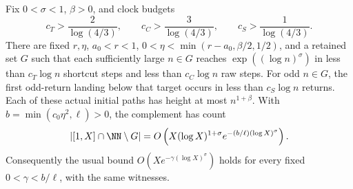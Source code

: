 \begin{proposition}
\label{prop:Shaik-stretched-fixed}
Fix \(0<\sigma<1\), \(\beta>0\), and clock budgets
\[
 c_T>\frac2{\log(4/3)},\qquad
 c_C>\frac3{\log(4/3)},\qquad
 c_S>\frac1{\log(4/3)}.
\]
There are fixed \(r,\eta\), \(a_0<r<1\),
\(0<\eta<\min(r-a_0,\beta/2,1/2)\), and a retained set \(G\) such that
each sufficiently large \(n\in G\) reaches
\(\exp((\log n)^\sigma)\) in less than \(c_T\log n\) shortcut steps
and less than \(c_C\log n\) raw steps.
For odd \(n\in G\), the first odd-return landing below that target
occurs in less than \(c_S\log n\) returns.
Each of these actual initial paths has height at most \(n^{1+\beta}\).
With \(b=\min(c_0\eta^2,\ell)>0\), the complement has count
\begin{equation}\label{eq:Shaik-stretched-rate}
 |[1,X]\cap\NN\setminus G|
 =O\left(X(\log X)^{1+\sigma}
        e^{-(b/\ell)(\log X)^\sigma}\right).
\end{equation}
Consequently the usual bound \(O(Xe^{-\gamma(\log X)^\sigma})\)
holds for every fixed \(0<\gamma<b/\ell\), with the same witnesses.
\end{proposition}
